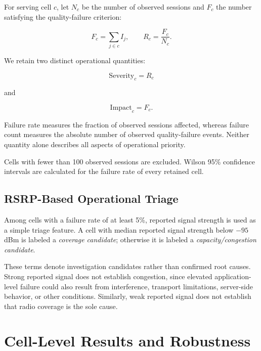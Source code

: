 \documentclass[conference]{IEEEtran}
\begin{document}
For serving cell $c$, let $N_c$ be the number of observed sessions and $F_c$ the number satisfying the quality-failure criterion:

\begin{equation}
F_c =
\sum_{j\in c} I_j,
\qquad
R_c =
\frac{F_c}{N_c}.
\end{equation}

We retain two distinct operational quantities:

\begin{equation}
\mathrm{Severity}_c=R_c
\end{equation}

and

\begin{equation}
\mathrm{Impact}_c=F_c.
\end{equation}

Failure rate measures the fraction of observed sessions affected, whereas failure count measures the absolute number of observed quality-failure events. Neither quantity alone describes all aspects of operational priority.

Cells with fewer than 100 observed sessions are excluded. Wilson 95\% confidence intervals are calculated for the failure rate of every retained cell.

\subsection{RSRP-Based Operational Triage}

Among cells with a failure rate of at least 5\%, reported signal strength is used as a simple triage feature. A cell with median reported signal strength below $-95$\,dBm is labeled a \emph{coverage candidate}; otherwise it is labeled a \emph{capacity/congestion candidate}.

These terms denote investigation candidates rather than confirmed root causes. Strong reported signal does not establish congestion, since elevated application-level failure could also result from interference, transport limitations, server-side behavior, or other conditions. Similarly, weak reported signal does not establish that radio coverage is the sole cause.

\section{Cell-Level Results and Robustness}
\end{document}
